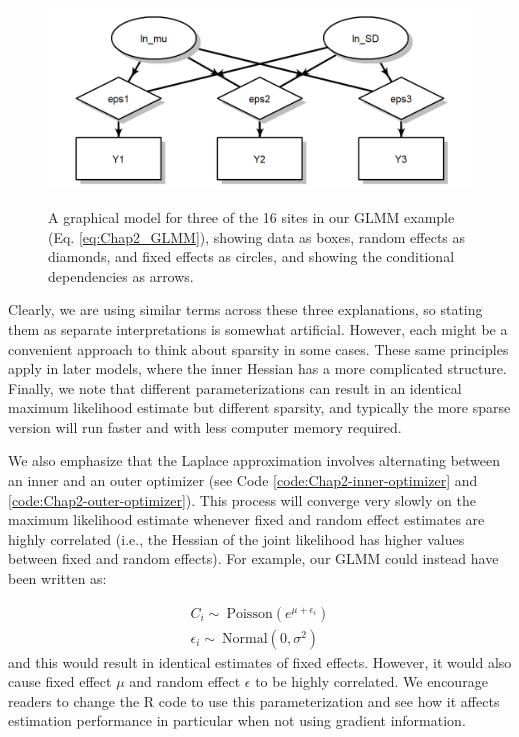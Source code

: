 \begin{enumerate}
\begin{figure}[!ht]
    \caption[Graphical illustration of GLMM parameters and data]{A graphical model for three of the 16 sites in our GLMM example (Eq. \ref{eq:Chap2_GLMM}), showing data as boxes, random effects as diamonds, and fixed effects as circles, and showing the conditional dependencies as arrows.}
    \centering
    \includegraphics[width=5.5in]{Chap_2/graph.png}
    \label{fig:Chap2_graph}
\end{figure}

\end{enumerate}
Clearly, we are using similar terms across these three explanations, so stating them as separate interpretations is somewhat artificial.  However, each might be a convenient approach to think about sparsity in some cases.  These same principles apply in later models, where the inner Hessian has a more complicated structure.  Finally, we note that different parameterizations can result in an identical maximum likelihood estimate but different sparsity, and typically the more sparse version will run faster and with less computer memory required.  

We also emphasize that the Laplace approximation involves alternating between an inner and an outer optimizer (see Code \ref{code:Chap2-inner-optimizer} and \ref{code:Chap2-outer-optimizer}). This process will converge very slowly on the maximum likelihood estimate whenever fixed and random effect estimates are highly correlated (i.e., the Hessian of the joint likelihood has higher values between fixed and random effects).  For example, our GLMM could instead have been written as:

\begin{equation} \label{eq:Chap2_slow_laplace}
\begin{gathered}
    C_i \sim\ \mathrm{Poisson}( e^{\mu+\epsilon_i} ) \\ 
    \epsilon_i \sim\ \mathrm{Normal}( 0, \sigma^2 )
\end{gathered}
\end{equation}
and this would result in identical estimates of fixed effects. However, it would also cause fixed effect \(\mu\) and random effect \(\epsilon\) to be highly correlated.  We encourage readers to change the R code to use this parameterization and see how it affects estimation performance in particular when not using gradient information.  


